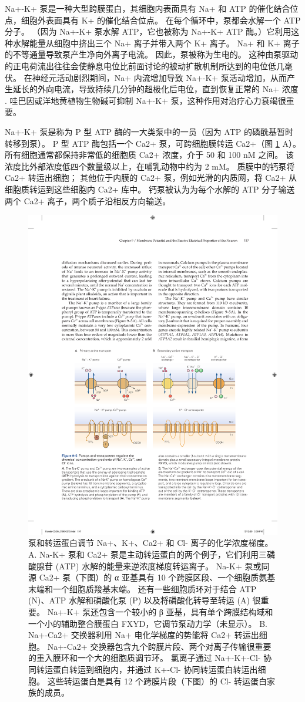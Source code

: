 Na+-K+ 泵是一种大型跨膜蛋白，其细胞内表面具有 Na+ 和 ATP 的催化结合位点，细胞外表面具有 K+ 的催化结合位点。 
在每个循环中，泵都会水解一个 ATP 分子。 
（因为 Na+-K+ 泵水解 ATP，它也被称为 Na+-K+ ATP 酶。）它利用这种水解能量从细胞中挤出三个 Na+ 离子并带入两个 K+ 离子。 
Na+ 和 K+ 离子的不等通量导致泵产生净向外离子电流。 
因此，泵被称为生电的。 
这种由泵驱动的正电荷流出往往会使静息电位比前面讨论的被动扩散机制所达到的电位低几毫伏。 
在神经元活动剧烈期间，Na+ 内流增加导致 Na+-K+ 泵活动增加，从而产生延长的外向电流，导致持续几分钟的超极化后电位，直到恢复正常的 Na+ 浓度 . 哇巴因或洋地黄植物生物碱可抑制 Na+-K+ 泵，这种作用对治疗心力衰竭很重要。


Na+-K+ 泵是称为 P 型 ATP 酶的一大类泵中的一员（因为 ATP 的磷酰基暂时转移到泵）。 
P 型 ATP 酶包括一个 Ca2+ 泵，可跨细胞膜转运 Ca2+（图 \ref{fig:9_5} A）。 
所有细胞通常都保持非常低的细胞质 Ca2+ 浓度，介于 50 和 100 nM 之间。 
该浓度比外部浓度低四个数量级以上，在哺乳动物中约为 2 mM。 
质膜中的钙泵将 Ca2+ 转运出细胞； 其他位于内膜的 Ca2+ 泵，例如光滑的内质网，将 Ca2+ 从细胞质转运到这些细胞内 Ca2+ 库中。 
钙泵被认为为每个水解的 ATP 分子输送两个 Ca2+ 离子，两个质子沿相反方向输送。

\begin{figure}[htbp]
	\centering
	\includegraphics[width=0.7\linewidth]{chap09/fig_9_5}
	\caption{泵和转运蛋白调节 Na+、K+、Ca2+ 和 Cl- 离子的化学浓度梯度。 A. Na-K+ 泵和 Ca2+ 泵是主动转运蛋白的两个例子，它们利用三磷酸腺苷 (ATP) 水解的能量来逆浓度梯度转运离子。 Na-K+ 泵或同源 Ca2+ 泵（下图）的 α 亚基具有 10 个跨膜区段、一个细胞质氨基末端和一个细胞质羧基末端。 还有一些细胞质环对于结合 ATP (N)、ATP 水解和磷酸化泵 (P) 以及将磷酸化转导至转运 (A) 很重要。 Na+-K+ 泵还包含一个较小的 β 亚基，具有单个跨膜结构域和一个小的辅助整合膜蛋白 FXYD，它调节泵动力学（未显示）。 B. Na+-Ca2+ 交换器利用 Na+ 电化学梯度的势能将 Ca2+ 转运出细胞。 Na+-Ca2+ 交换器包含九个跨膜片段、两个对离子传输很重要的重入膜环和一个大的细胞质调节环。 氯离子通过 Na+-K+-Cl- 协同转运蛋白转运到细胞内，并通过 K+-Cl- 协同转运蛋白转运出细胞。 这些转运蛋白是具有 12 个跨膜片段（下图）的 Cl- 转运蛋白家族的成员。}
	\label{fig:9_5}
\end{figure}


